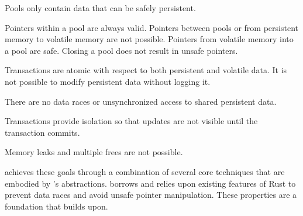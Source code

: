 \begin{goal}
  Pools only contain data that can be safely persistent.\label{goal:only-persistent-objects}
\end{goal}
\begin{goal}
  Pointers within a pool are always valid.  Pointers between pools or from
  persistent memory to volatile memory are not possible.  Pointers from
  volatile memory into a pool are safe.  Closing a pool does not result in
  unsafe pointers.\label{goal:ptrs-are-safe}
\end{goal}
\begin{goal}
  Transactions are atomic with respect to both persistent and volatile data.
  It is not possible to modify persistent data without logging
  it.\label{goal:atomic-is-atomic}
\end{goal}
\begin{goal}[No-Races]
  There are no data races or unsynchronized access to shared persistent data. \label{goal:no-races}
\end{goal}
\begin{goal}
  Transactions provide isolation so that updates are not visible until the transaction commits. \label{goal:atomic-is-isolated}
\end{goal}
\begin{goal}[No-Leaks]
  Memory leaks and multiple frees are not possible. \label{goal:no-memory-leaks}
\end{goal}

\This{} achieves these goals through a combination of several core techniques
that are embodied by \this{}'s abstractions.  \This{} borrows and relies
upon existing features of Rust to prevent data races and avoid unsafe pointer
manipulation.  These properties are a foundation that \this{} builds upon.

